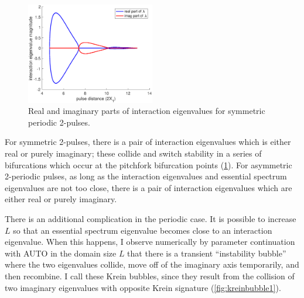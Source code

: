 \documentclass[12pt,reqno,oneside]{article}
\theoremstyle{definition}
\theoremstyle{remark}
\begin{document}
\begin{figure}
\includegraphics[width=0.5\textwidth]{images/periodicequaleigbif}
\caption{Real and imaginary parts of interaction eigenvalues for symmetric periodic 2-pulses.}
\label{fig:periodicequaleigbif}
\end{figure}
For symmetric 2-pulses, there is a pair of interaction eigenvalues which is either real or purely imaginary; these collide and switch stability in a series of bifurcations which occur at the pitchfork bifurcation points (\cref{fig:periodicequaleigbif}). For asymmetric 2-periodic pulses, as long as the interaction eigenvalues and essential spectrum eigenvalues are not too close, there is a pair of interaction eigenvalues which are either real or purely imaginary. 

There is an additional complication in the periodic case. It is possible to increase $L$ so that an essential spectrum eigenvalue becomes close to an interaction eigenvalue. When this happens, I observe numerically by parameter continuation with AUTO in the domain size $L$ that there is a transient ``instability bubble'' where the two eigenvalues collide, move off of the imaginary axis temporarily, and then recombine. I call these Krein bubbles, since they result from the collision of two imaginary eigenvalues with opposite Krein signature (\cref{fig:kreinbubble1}).
\end{document}
